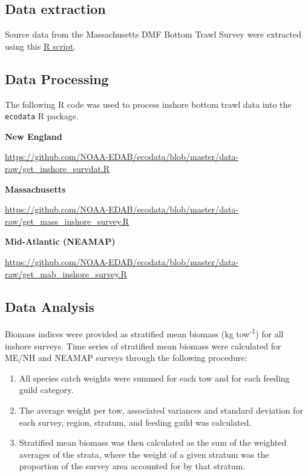 \documentclass[
]{book}
\providecommand{\tightlist}{%
  \setlength{\itemsep}{0pt}\setlength{\parskip}{0pt}}
\begin{document}
\hypertarget{data-extraction-18}{%
\subsection{Data extraction}\label{data-extraction-18}}

Source data from the Massachusetts DMF Bottom Trawl Survey were extracted using this \href{https://github.com/slucey/RSurvey/blob/master/Mass_survey.R}{R script}.

\hypertarget{data-processing-15}{%
\subsection{Data Processing}\label{data-processing-15}}

The following R code was used to process inshore bottom trawl data into the \texttt{ecodata} R package.

\textbf{New England}

\url{https://github.com/NOAA-EDAB/ecodata/blob/master/data-raw/get_inshore_survdat.R}

\textbf{Massachusetts}

\url{https://github.com/NOAA-EDAB/ecodata/blob/master/data-raw/get_mass_inshore_survey.R}

\textbf{Mid-Atlantic (NEAMAP)}

\url{https://github.com/NOAA-EDAB/ecodata/blob/master/data-raw/get_mab_inshore_survey.R}

\hypertarget{data-analysis-20}{%
\subsection{Data Analysis}\label{data-analysis-20}}

Biomass indices were provided as stratified mean biomass (kg tow\textsuperscript{-1}) for all inshore surveys. Time series of stratified mean biomass were calculated for ME/NH and NEAMAP surveys through the following procedure:

\begin{enumerate}
\def\labelenumi{\arabic{enumi}.}
\tightlist
\item
  All species catch weights were summed for each tow and for each feeding guild category.
\item
  The average weight per tow, associated variances and standard deviation for each survey, region, stratum, and feeding guild was calculated.
\item
  Stratified mean biomass was then calculated as the sum of the weighted averages of the strata, where the weight of a given stratum was the proportion of the survey area accounted for by that stratum.
\end{enumerate}
\end{document}
